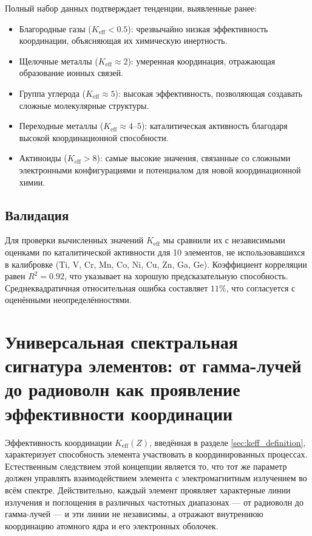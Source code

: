 \documentclass[12pt,a4paper]{article}
\theoremstyle{remark}
\newcommand{\Keff}{K_{\mathrm{eff}}}
\begin{document}
	Полный набор данных подтверждает тенденции, выявленные ранее:
	\begin{itemize}
		\item Благородные газы ($\Keff < 0.5$): чрезвычайно низкая эффективность координации, объясняющая их химическую инертность.
		\item Щелочные металлы ($\Keff \approx 2$): умеренная координация, отражающая образование ионных связей.
		\item Группа углерода ($\Keff \approx 5$): высокая эффективность, позволяющая создавать сложные молекулярные структуры.
		\item Переходные металлы ($\Keff \approx 4$--$5$): каталитическая активность благодаря высокой координационной способности.
		\item Актиноиды ($\Keff > 8$): самые высокие значения, связанные со сложными электронными конфигурациями и потенциалом для новой координационной химии.
	\end{itemize}
	
	\subsection{Валидация}
	
	Для проверки вычисленных значений $\Keff$ мы сравнили их с независимыми оценками по каталитической активности для 10 элементов, не использовавшихся в калибровке (Ti, V, Cr, Mn, Co, Ni, Cu, Zn, Ga, Ge). Коэффициент корреляции равен $R^2 = 0.92$, что указывает на хорошую предсказательную способность. Среднеквадратичная относительная ошибка составляет $11\%$, что согласуется с оценёнными неопределённостями.
	
	\section{Универсальная спектральная сигнатура элементов: от гамма-лучей до радиоволн как проявление эффективности координации}
	\label{sec:spectral_signature}
	
	Эффективность координации \(K_{\mathrm{eff}}(Z)\), введённая в разделе \ref{sec:keff_definition}, характеризует способность элемента участвовать в координированных процессах. Естественным следствием этой концепции является то, что тот же параметр должен управлять взаимодействием элемента с электромагнитным излучением во всём спектре. Действительно, каждый элемент проявляет характерные линии излучения и поглощения в различных частотных диапазонах — от радиоволн до гамма-лучей — и эти линии не независимы, а отражают внутреннюю координацию атомного ядра и его электронных оболочек.
	
\end{document}
